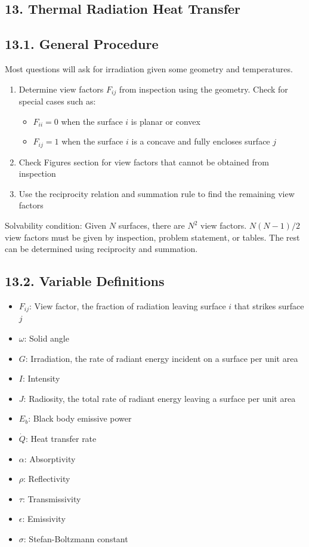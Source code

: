 \begin{multicols*}{2}
\section*{13. Thermal Radiation Heat Transfer}
\subsection*{13.1. General Procedure}
Most questions will ask for irradiation given some geometry and temperatures.
\begin{enumerate}
    \item Determine view factors $F_{ij}$ from inspection using the geometry.  Check for special cases such as:
    \begin{itemize}
        \item $F_{ii} = 0$ when the surface $i$ is planar or convex
        \item $F_{ij} = 1$ when the surface $i$ is a concave and fully encloses surface $j$
    \end{itemize}
    \item Check Figures section for view factors that cannot be obtained from inspection
    \item Use the reciprocity relation and summation rule to find the remaining view factors
\end{enumerate}
Solvability condition: Given $N$ surfaces, there are $N^2$ view factors. $N(N-1)/2$ view factors must be 
given by inspection, problem statement, or tables. The rest can be determined using reciprocity and summation.
\subsection*{13.2. Variable Definitions}
\begin{itemize}
    \item $F_{ij}$: View factor, the fraction of radiation leaving surface $i$ that strikes surface $j$ 
    \item $\omega$: Solid angle
    \item $G$: Irradiation, the rate of radiant energy incident on a surface per unit area
    \item $I$: Intensity
    \item $J$: Radiosity, the total rate of radiant energy leaving a surface per unit area
    \item $E_{b}$: Black body emissive power
    \item $\dot{Q}$: Heat transfer rate
    \item $\alpha$: Absorptivity
    \item $\rho$: Reflectivity
    \item $\tau$: Transmissivity
    \item $\epsilon$: Emissivity
    \item $\sigma$: Stefan-Boltzmann constant
\end{itemize}

\end{multicols*}
